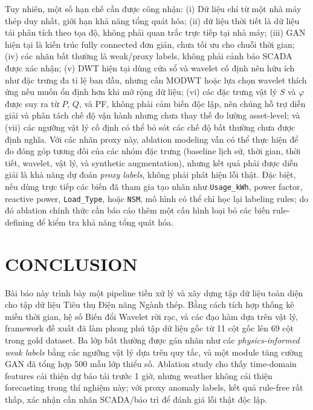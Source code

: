 \documentclass[conference]{IEEEtran}
\begin{document}
Tuy nhiên, một số hạn chế cần được công nhận:
(i) Dữ liệu chỉ từ một nhà máy thép duy nhất, giới hạn khả năng tổng quát hóa;
(ii) dữ liệu thời tiết là dữ liệu tái phân tích theo tọa độ, không phải quan trắc trực tiếp tại nhà máy;
(iii) GAN hiện tại là kiến trúc fully connected đơn giản, chưa tối ưu cho chuỗi thời gian;
(iv) các nhãn bất thường là weak/proxy labels, không phải cảnh báo SCADA được xác nhận;
(v) DWT hiện tại dùng cửa sổ và wavelet cố định nên hữu ích như đặc trưng đa tỉ lệ ban đầu,
nhưng cần MODWT hoặc lựa chọn wavelet thích ứng nếu muốn ổn định hơn khi mở rộng dữ liệu;
(vi) các đặc trưng vật lý $S$ và $\varphi$ được suy ra từ $P$, $Q$, và PF, không phải cảm biến độc lập,
nên chúng hỗ trợ diễn giải và phân tách chế độ vận hành nhưng chưa thay thế đo lường asset-level;
và (vii) các ngưỡng vật lý cố định có thể bỏ sót các chế độ bất thường chưa được định nghĩa.
Với các nhãn proxy này, ablation modeling vẫn có thể thực hiện để đo đóng góp tương đối của các nhóm đặc trưng
(baseline lịch sử, thời gian, thời tiết, wavelet, vật lý, và synthetic augmentation),
nhưng kết quả phải được diễn giải là khả năng dự đoán \textit{proxy labels}, không phải phát hiện lỗi thật.
Đặc biệt, nếu dùng trực tiếp các biến đã tham gia tạo nhãn như \texttt{Usage\_kWh}, power factor,
reactive power, \texttt{Load\_Type}, hoặc \texttt{NSM}, mô hình có thể chỉ học lại labeling rules;
do đó ablation chính thức cần báo cáo thêm một cấu hình loại bỏ các biến rule-defining để kiểm tra khả năng tổng quát hóa.


\section{CONCLUSION}
\label{sec:conclusion}

Bài báo này trình bày một pipeline tiền xử lý và xây dựng tập dữ liệu toàn diện
cho tập dữ liệu Tiêu thụ Điện năng Ngành thép.
Bằng cách tích hợp thống kê miền thời gian, hệ số Biến đổi Wavelet rời rạc,
và các đạo hàm dựa trên vật lý, framework đề xuất đã làm phong phú tập dữ liệu gốc
từ 11 cột gốc lên 69 cột trong gold dataset.
Ba lớp bất thường được gán nhãn như các \textit{physics-informed weak labels} bằng các ngưỡng vật lý dựa trên quy tắc,
và một module tăng cường GAN đã tổng hợp 500 mẫu lớp thiểu số.
Ablation study cho thấy time-domain features cải thiện dự báo tải trước 1 giờ,
nhưng weather không cải thiện forecasting trong thí nghiệm này; với proxy anomaly labels,
kết quả rule-free rất thấp, xác nhận cần nhãn SCADA/bảo trì để đánh giá lỗi thật độc lập.
\end{document}
